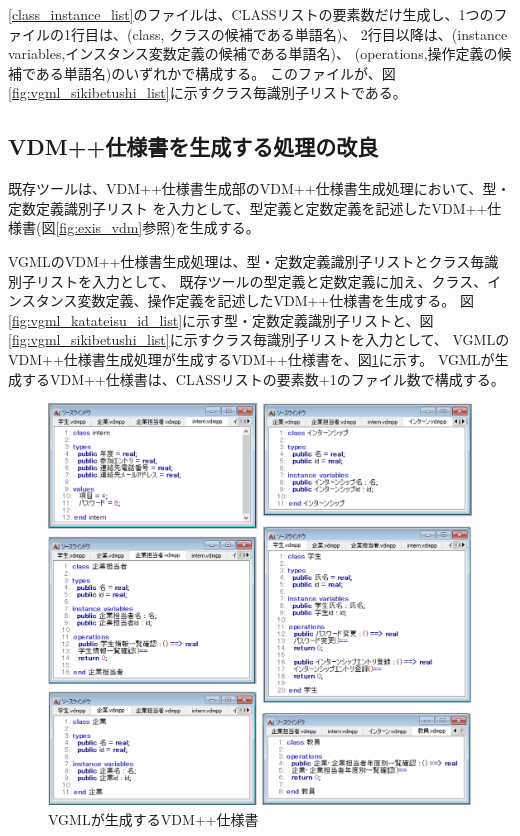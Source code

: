 \ref{class_instance_list}のファイルは、CLASSリストの要素数だけ生成し、1つのファイルの1行目は、(class, クラスの候補である単語名)、
2行目以降は、(instance variables,インスタンス変数定義の候補である単語名)、 (operations,操作定義の候補である単語名)のいずれかで構成する。
このファイルが、図\ref{fig:vgml_sikibetushi_list}に示すクラス毎識別子リストである。

\subsection{VDM++仕様書を生成する処理の改良}
既存ツールは、VDM++仕様書生成部のVDM++仕様書生成処理において、型・定数定義識別子リスト
を入力として、型定義と定数定義を記述したVDM++仕様書(図\ref{fig:exis_vdm}参照)を生成する。

VGMLのVDM++仕様書生成処理は、型・定数定義識別子リストとクラス毎識別子リストを入力として、
既存ツールの型定義と定数定義に加え、クラス、インスタンス変数定義、操作定義を記述したVDM++仕様書を生成する。
図\ref{fig:vgml_katateisu_id_list}に示す型・定数定義識別子リストと、図\ref{fig:vgml_sikibetushi_list}に示すクラス毎識別子リストを入力として、
VGMLのVDM++仕様書生成処理が生成するVDM++仕様書を、図\ref{fig:4_vdm}に示す。
VGMLが生成するVDM++仕様書は、CLASSリストの要素数+1のファイル数で構成する。

\begin{figure}[p]
    \begin{center}
        \includegraphics[width=1.0\columnwidth]{image/4_vdm.png}
        \caption{VGMLが生成するVDM++仕様書}
        \label{fig:4_vdm}
    \end{center}
\end{figure}

